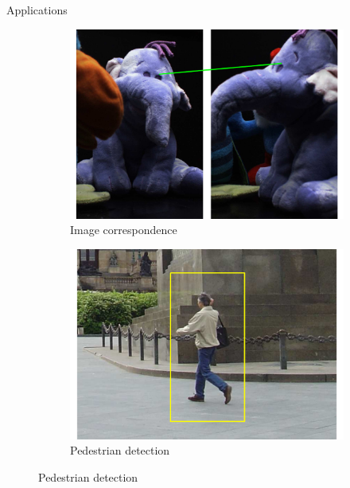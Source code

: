 \documentclass[14pt,t]{beamer}
\begin{document}
%
\begin{frame}{Applications}
\begin{figure}
\centering
	\begin{subfigure}[t]{0.49\textwidth}
		\includegraphics[width=\textwidth]{../report/img/introductionIC.pdf}
		\caption{Image correspondence}
	\end{subfigure}
	\begin{subfigure}[t]{0.49\textwidth}
		\includegraphics[width=\textwidth]{../report/img/introductionOD.pdf}
		\caption{Pedestrian detection}
	\end{subfigure}
\end{figure}
\end{frame}
%
\end{document}
